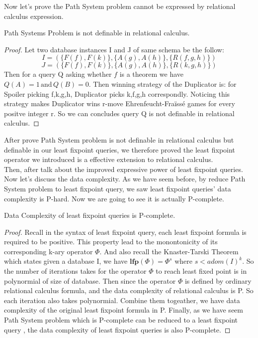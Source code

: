 Now let's prove the Path System problem cannot be expressed by relational calculus expression.

\begin{claim}
Path Systems Problem is not definable in relational calculus.
\end{claim}

\begin{proof}
Let two database instances I and J of same schema be the follow:
$$I=(\{F(f), F(k)\}, \{A(g),A(h)\},\{R(f,g,h)\})$$
$$J=(\{F(f), F(k)\}, \{A(g),A(h)\}, \{R(k,g,h)\})$$
Then for a query Q asking whether $f$ is a theorem we have $Q(A)=1 \, \text{and} \, Q(B)=0$. Then winning strategy of the Duplicator is: for Spoiler picking f,k,g,h, Duplicator picks k,f,g,h correspondly. Noticing this strategy makes Duplicator wins r-move Ehrenfeucht-Fra\"iss\'e games for every positve integer r. So we can concludes query Q is not definable in relational calculus.
\end{proof}

After prove Path System problem is not definable in relational calculus but definable in our least fixpoint queries, we therefore proved the least fixpoint operator we introduced is a effective extension to relational calculus.\\

Then, after talk about the improved expressive power of least fixpoint queries. Now let's discuss the data complexity. As we have seem before, by reduce Path System problem to least fixpoint query, we saw least fixpoint queries' data complexity is P-hard. Now we are going to see it is actually P-complete.\\

\begin{claim}
Data Complexity of least fixpoint queries is P-complete.
\end{claim}
\begin{proof}
Recall in the syntax of least fixpoint query, each least fixpoint formula is required to be positive. This property lead to the monontonicity of its corresponding k-ary operator $\Phi$. And also recall the Knaster-Tarski Theorem which states given a database I, we have $\textbf{lfp}(\Phi)=\Phi^s$ where $s<adom(I)^k$. So the number of iterations takes for the operator $\Phi$ to reach least fixed point is in polynormial of size of database. Then since the operator $\Phi$ is defined by ordinary relational calculus formula, and the data complexity of relational calculus is P. So each iteration also takes polynormial. Combine them togeather, we have data complexity of the original least fixpoint formula in P. Finally, as we have seem Path System problem which is P-complete can be reduced to a least fixpoint query , the data complexity of least fixpoint queries is also P-complete. 
\end{proof}

